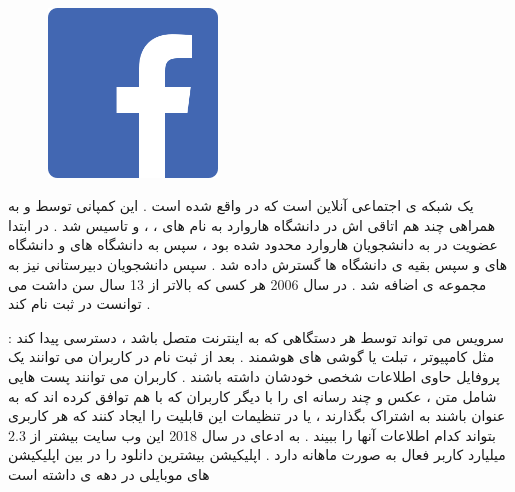 \documentclass[12pt]{book}
\begin{document}
\begin{figure}
  \vspace{110pt}
  \begin{center}
    \includegraphics[width=0.4\textwidth]{./fb_icon_325x325.png}
  \end{center}
  \vspace{-20pt}
  \caption{}
  \vspace{-160pt}
\end{figure}



یک شبکه ی اجتماعی آنلاین است که در 
واقع شده است . این کمپانی توسط
و به همراهی چند هم اتاقی اش در دانشگاه هاروارد به نام های 
،
،
و
تاسیس شد .
در ابتدا عضویت در 
به دانشجویان هاروارد محدود شده بود ، سپس به دانشگاه های 
و دانشگاه های 
و سپس بقیه ی دانشگاه ها گسترش داده شد .
سپس دانشجویان دبیرستانی نیز به مجموعه ی 
اضافه شد .
در سال 2006 هر کسی که بالاتر از 13 سال سن داشت می توانست در
ثبت نام کند .

سرویس 
می تواند توسط هر دستگاهی که به اینترنت متصل باشد ، دسترسی پیدا کند : مثل کامپیوتر ، تبلت یا گوشی های هوشمند .
بعد از ثبت نام در 
کاربران می توانند یک پروفایل حاوی اطلاعات شخصی خودشان داشته باشند . کاربران می توانند پست هایی شامل متن ، عکس و چند رسانه ای را با دیگر کاربران که با هم توافق کرده اند که به عنوان
باشند به اشتراک بگذارند ، یا در تنظیمات این قابلیت را ایجاد کنند که هر کاربری بتواند کدام اطلاعات آنها را ببیند .
به ادعای 
در سال 2018 این وب سایت بیشتر از
$ 2.3$
 میلیارد کاربر فعال به صورت ماهانه دارد .
اپلیکیشن 
بیشترین دانلود را در بین اپلیکیشن های موبایلی در دهه ی 
داشته است

\subsubsection{}
\end{document}
